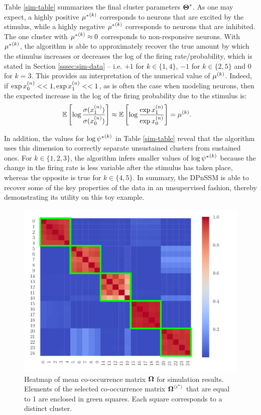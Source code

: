 \documentclass[twoside]{article}
\begin{document}
Table \ref{sim-table} summarizes the final cluster parameters $\bd \Theta^*$.  As one may expect, a highly positive $\idx {\mu^*} k$ corresponds to neurons that are excited by the stimulus, while a highly negative $\idx {\mu^*} k$ corresponds to neurons that are inhibited.  The one cluster with $\idx {\mu^*} k \approx 0$ corresponds to non-responsive neurons.  With $\idx {\mu^*} k$, the algorithm is able to approximately recover the true amount by which the stimulus increases or decreases the log of the firing rate/probability, which is stated in Section \ref{sssec:sim-data} -- i.e. $+1$ for $k \in \{1, 4\}$, $-1$ for $k \in \{2, 5\}$ and $0$ for $k = 3$.  This provides an interpretation of the numerical value of $\idx \mu k$.  Indeed, if $\exp \idx[0] x n < < 1, \exp \idx[1] x n << 1$, as is often the case when modeling neurons, then the expected increase in the log of the firing probability due to the stimulus is: 
\begin{align}
\E & \left[\log \frac{\sigma(\idx[1] x n)}{\sigma(\idx[0] x n)}\right] \approx \E \left[\log \frac{\exp \idx[1] x n}{\exp \idx[0] x n} \right] = \idx \mu k.
\end{align}   

In addition, the values for $\log \idx {\psi^*} k$ in Table \ref{sim-table} reveal that the algorithm uses this dimension to correctly separate unsustained clusters from sustained ones.  For $k \in \{1, 2, 3\}$, the algorithm infers smaller values of $\log \idx {\psi^*} k$ because the change in the firing rate is less variable after the stimulus has taken place, whereas the opposite is true for $k \in \{4, 5\}$.  In summary, the DPnSSM is able to recover some of the key properties of the data in an unsupervised fashion, thereby demonstrating its utility on this toy example.

\begin{figure}[h]
\begin{center}
\includegraphics[scale=0.3]{../img/sim.pdf}
\end{center}
\caption{Heatmap of mean co-occurrence matrix $\bd \Omega$ for simulation results.  Elements of the selected co-occurrence matrix $\baidx \Omega {i^*}$ that are equal to 1 are enclosed in green squares.  Each square corresponds to a distinct cluster.}
\label{sim-hm}
\end{figure}
\end{document}
